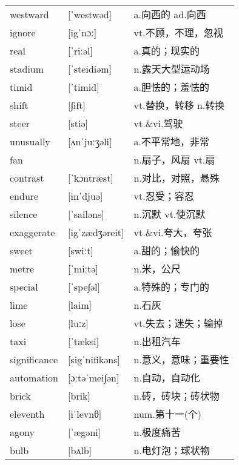 \documentclass[a4paper]{article}
\begin{document}
\section{}
\begin{tabular}{l l l}

westward & [ˈwestwəd] & a.向西的 ad.向西 \\
ignore & [igˈnɔː] & vt.不顾，不理，忽视 \\
real & [ˈriːəl] & a.真的；现实的 \\
stadium & [ˈsteidiəm] & n.露天大型运动场 \\
timid & [ˈtimid] & a.胆怯的；羞怯的 \\
shift & [∫ift] & vt.替换，转移 n.转换 \\
steer & [stiə] & vt.\&vi.驾驶 \\
unusually & [ʌnˈjuːʒəli] & a.不平常地，非常 \\
fan &  & n.扇子，风扇 vt.扇 \\
contrast & [ˈkɔntræst] & n.对比，对照，悬殊 \\
endure & [inˈdjuə] & vt.忍受；容忍 \\
silence & [ˈsailəns] & n.沉默 vt.使沉默 \\
exaggerate & [igˈzædʒəreit] & vt.\&vi.夸大，夸张 \\
sweet & [swiːt] & a.甜的；愉快的 \\
metre & [ˈmiːtə] & n.米，公尺 \\
special & [ˈspe∫əl] & a.特殊的；专门的 \\
lime & [laim] & n.石灰 \\
lose & [luːz] & vt.失去；迷失；输掉 \\
taxi & [ˈtæksi] & n.出租汽车 \\
significance & [sigˈnifikəns] & n.意义，意味；重要性 \\
automation & [ɔːtəˈmei∫ən] & n.自动，自动化 \\
brick & [brik] & n.砖，砖块；砖状物 \\
eleventh & [iˈlevnθ] & num.第十一(个) \\
agony & [ˈægəni] & n.极度痛苦 \\
bulb & [bʌlb] & n.电灯泡；球状物 \\

\end{tabular}
\end{document}
